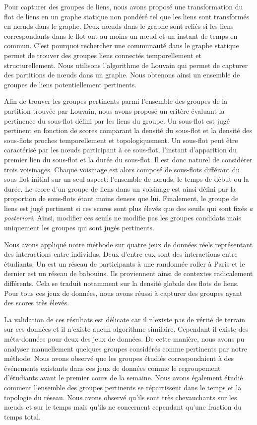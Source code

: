 Pour capturer des groupes de liens, nous avons proposé une transformation du flot de liens en un graphe statique non pondéré tel que les liens sont transformés en n\oe{}uds dans le graphe.
Deux n\oe{}uds dans le graphe sont reliés si les liens correspondants dans le flot ont au moins un n\oe{}ud et un instant de temps en commun.
C'est pourquoi rechercher une communauté dans le graphe statique permet de trouver des groupes liens connectés temporellement et structurellement.
Nous utilisons l'algorithme de Louvain qui permet de capturer des partitions de n\oe{}uds dans un graphe.
Nous obtenons ainsi un ensemble de groupes de liens potentiellement pertinents.

Afin de trouver les groupes pertinents parmi l'ensemble des groupes de la partition trouvée par Louvain, nous avons proposé un critère évaluant la pertinence du sous-flot défini par les liens du groupe.
Un sous-flot est jugé pertinent en fonction de scores comparant la densité du sous-flot et la densité des sous-flots proches temporellement et topologiquement.
Un sous-flot peut être caractérisé par les n\oe{}uds participant à ce sous-flot, l'instant d'apparition du premier lien du sous-flot et la durée du sous-flot.
Il est donc naturel de considérer trois voisinages.
Chaque voisinage est alors composé de sous-flots différant du sous-flot initial sur un seul aspect: l'ensemble de n\oe{}uds, le temps de début ou la durée.
Le score d'un groupe de liens dans un voisinage est ainsi défini par la proportion de sous-flots étant moins denses que lui.
Finalement, le groupe de liens est jugé pertinent si ces scores sont plus élevés que des seuils qui sont fixés \emph{a posteriori}.
Ainsi, modifier ces seuils ne modifie pas les groupes candidats mais uniquement les groupes qui sont jugés pertinents.


Nous avons appliqué notre méthode sur quatre jeux de données réels représentant des interactions entre individus.
Deux d'entre eux sont des interactions entre étudiants.
Un est un réseau de participants à une randonnée roller à Paris et le dernier est un réseau de babouins.
Ils proviennent ainsi de contextes radicalement différents.
Cela se traduit notamment sur la densité  globale des flots de liens.
Pour tous ces jeux de données, nous avons réussi à capturer des groupes ayant des scores très élevés.

La validation de ces résultats est délicate car il n'existe pas de vérité de terrain sur ces données et il n'existe aucun algorithme similaire.
Cependant il existe des méta-données pour deux des jeux de données.
De cette manière, nous avons pu analyser manuellement quelques groupes considérés comme pertinents par notre méthode.
Nous avons observé que les groupes étudiés correspondaient à des événements existants dans ces jeux de données comme le regroupement d'étudiants avant le premier cours de la semaine.
Nous avons également étudié comment l'ensemble des groupes pertinents se répartissent dans le temps et la topologie du réseau.
Nous avons observé qu'ils sont très chevauchants sur les n\oe{}uds et sur le temps mais qu'ils ne concernent cependant qu'une fraction du temps total.


